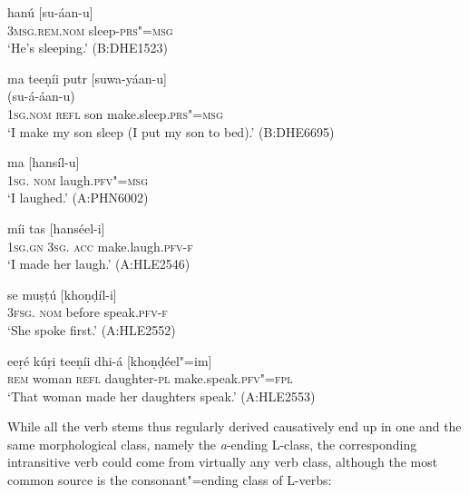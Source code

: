 \begin{exe}
\ex
\label{ex:8-7}
\gll hanú [su-áan-u] \\
\textsc{3msg.rem.nom} sleep-\textsc{prs"=msg} \\
\glt `He's sleeping.' (B:DHE1523)
\end{exe}
\begin{exe}
\ex
\label{ex:8-8}
\glll ma teeṇíi putr [suwa-yáan-u]  \\
{} {} {}  (su-á-áan-u) \\
\textsc{1sg.nom} \textsc{refl} son make.sleep.\textsc{prs"=msg} \\
\glt `I make my son sleep (I put my son to bed).' (B:DHE6695)
\end{exe}
\begin{exe}
\ex
\label{ex:8-9}
\gll ma [hansíl-u] \\
\textsc{1sg. nom} laugh.\textsc{pfv"=msg} \\
\glt `I laughed.' (A:PHN6002)
\end{exe}
\begin{exe}
\ex
\label{ex:8-10}
\gll míi tas [hanséel-i] \\
\textsc{1sg.gn} \textsc{3sg. acc} make.laugh.\textsc{pfv-f} \\
\glt `I made her laugh.' (A:HLE2546)
\end{exe}
\begin{exe}
\ex
\label{ex:8-11}
\gll se muṣṭú [khoṇḍíl-i] \\
\textsc{3fsg. nom} before speak.\textsc{pfv-f} \\
\glt `She spoke first.' (A:HLE2552)
\end{exe}
\begin{exe}
\ex
\label{ex:8-12}
\gll eeṛé kúṛi teeṇíi dhi-á [khoṇḍéel"=im] \\
\textsc{rem} woman \textsc{refl} daughter-\textsc{pl} make.speak.\textsc{pfv"=fpl} \\
\glt `That woman made her daughters speak.' (A:HLE2553)
\end{exe}

While all the verb stems thus regularly derived causatively end up in one and the same morphological class, namely the \textit{a}-ending L-class, the corresponding intransitive verb could come from virtually any verb class, although the most common source is the consonant"=ending class of L-verbs:


